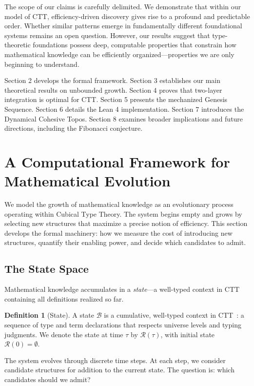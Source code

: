 \documentclass[11pt]{article}
\theoremstyle{definition}
\newtheorem{definition}{Definition}
\theoremstyle{plain}
\theoremstyle{remark}
\begin{document}
The scope of our claims is carefully delimited. We demonstrate that within our model of CTT, efficiency-driven discovery gives rise to a profound and predictable order. Whether similar patterns emerge in fundamentally different foundational systems remains an open question. However, our results suggest that type-theoretic foundations possess deep, computable properties that constrain how mathematical knowledge can be efficiently organized—properties we are only beginning to understand.

Section 2 develops the formal framework. Section 3 establishes our main theoretical results on unbounded growth. Section 4 proves that two-layer integration is optimal for CTT. Section 5 presents the mechanized Genesis Sequence. Section 6 details the Lean 4 implementation. Section 7 introduces the Dynamical Cohesive Topos. Section 8 examines broader implications and future directions, including the Fibonacci conjecture.

\section{A Computational Framework for Mathematical Evolution}
\label{sec:framework}

We model the growth of mathematical knowledge as an evolutionary process operating within Cubical Type Theory. The system begins empty and grows by selecting new structures that maximize a precise notion of efficiency. This section develops the formal machinery: how we measure the cost of introducing new structures, quantify their enabling power, and decide which candidates to admit.

\subsection{The State Space}

Mathematical knowledge accumulates in a \emph{state}—a well-typed context in CTT containing all definitions realized so far.

\begin{definition}[State]
A state $\mathcal{B}$ is a cumulative, well-typed context in CTT~\cite{cchm}: a sequence of type and term declarations that respects universe levels and typing judgments. We denote the state at time $\tau$ by $\mathcal{R}(\tau)$, with initial state $\mathcal{R}(0) = \emptyset$.
\end{definition}

The system evolves through discrete time steps. At each step, we consider candidate structures for addition to the current state. The question is: which candidates should we admit?
\end{document}
